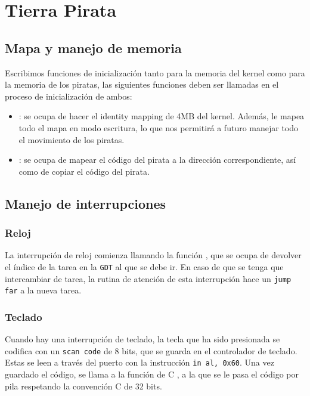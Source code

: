 \section{Tierra Pirata}

\subsection{Mapa y manejo de memoria}

Escribimos funciones de inicialización tanto para la memoria del kernel como para la memoria de los piratas, las siguientes funciones deben ser llamadas en el proceso de inicialización de ambos:

\begin{itemize}
\item {}: se ocupa de hacer el identity mapping de 4MB del kernel. Además, le mapea todo el mapa en modo escritura, lo que nos permitirá a futuro manejar todo el movimiento de los piratas.

\item {}: se ocupa de mapear el código del pirata a la dirección correspondiente, así como de copiar el código del pirata.
\end{itemize}


\subsection{Manejo de interrupciones}

\subsubsection{Reloj}

La interrupción de reloj comienza llamando la función , que se ocupa de devolver el índice de la tarea en la \texttt{GDT} al que se debe ir. En caso de que se tenga que intercambiar de tarea, la rutina de atención de esta interrupción hace un \texttt{jump far} a la nueva tarea.

\subsubsection{Teclado}

Cuando hay una interrupción de teclado, la tecla que ha sido presionada se codifica con un \texttt{scan code} de 8 bits, que se guarda en el controlador de teclado. Estas se leen a través del puerto  con la instrucción \texttt{in al, 0x60}. Una vez guardado el código, se llama a la función de C , a la que se le pasa el código por pila respetando la convención C de 32 bits.

